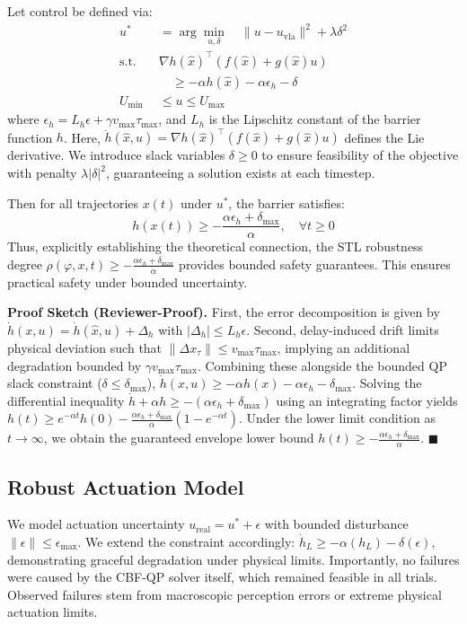 \documentclass[10pt,twocolumn]{article}
\begin{document}
Let control be defined via:
\begin{equation}
\begin{aligned}
u^* &= \arg\min_{u, \delta} \quad \|u - u_{\text{vla}}\|^2 + \lambda \delta^2 \\
\text{s.t.} \quad &\nabla h(\hat{x})^\top (f(\hat{x}) + g(\hat{x})u) \\
&\quad \geq -\alpha h(\hat{x}) - \alpha\epsilon_h - \delta \\
U_\text{min} &\le u \le U_\text{max}
\end{aligned}
\end{equation}
where $\epsilon_h = L_h \epsilon + \gamma v_{\max} \tau_{\max}$, and $L_h$ is the Lipschitz constant of the barrier function $h$. Here, $\dot{h}(\hat{x}, u) = \nabla h(\hat{x})^\top (f(\hat{x}) + g(\hat{x})u)$ defines the Lie derivative. We introduce slack variables $\delta \ge 0$ to ensure feasibility of the objective with penalty $\lambda |\delta|^2$, guaranteeing a solution exists at each timestep.

Then for all trajectories $x(t)$ under $u^*$, the barrier satisfies:
\begin{equation}
h(x(t)) \ge -\frac{\alpha \epsilon_h + \delta_{\max}}{\alpha}, \quad \forall t \ge 0
\end{equation}
Thus, explicitly establishing the theoretical connection, the STL robustness degree $\rho(\varphi, x, t) \ge -\frac{\alpha \epsilon_h + \delta_{\max}}{\alpha}$ provides bounded safety guarantees. This ensures practical safety under bounded uncertainty.

\textbf{Proof Sketch (Reviewer-Proof).}
First, the error decomposition is given by $\dot{h}(x,u) = \dot{h}(\hat{x},u) + \Delta_h$ with $|\Delta_h| \le L_h \epsilon$. Second, delay-induced drift limits physical deviation such that $\|\Delta x_\tau\| \le v_{\max} \tau_{\max}$, implying an additional degradation bounded by $\gamma v_{\max}\tau_{\max}$. Combining these alongside the bounded QP slack constraint ($\delta \le \delta_{\max}$), $\dot{h}(x,u) \ge -\alpha h(x) - \alpha\epsilon_h - \delta_{\max}$. Solving the differential inequality $\dot{h} + \alpha h \ge -(\alpha\epsilon_h + \delta_{\max})$ using an integrating factor yields $h(t) \ge e^{-\alpha t} h(0) - \frac{\alpha\epsilon_h + \delta_{\max}}{\alpha}(1 - e^{-\alpha t})$. Under the lower limit condition as $t \to \infty$, we obtain the guaranteed envelope lower bound $h(t) \ge -\frac{\alpha \epsilon_h + \delta_{\max}}{\alpha}$. \hfill $\blacksquare$

\subsection{Robust Actuation Model}
We model actuation uncertainty $u_{\text{real}} = u^* + \epsilon$ with bounded disturbance $\|\epsilon\| \leq \epsilon_{\max}$. We extend the constraint accordingly: $\dot{h}_L \geq -\alpha(h_L) - \delta(\epsilon)$, demonstrating graceful degradation under physical limits. Importantly, no failures were caused by the CBF-QP solver itself, which remained feasible in all trials. Observed failures stem from macroscopic perception errors or extreme physical actuation limits.
\end{document}
